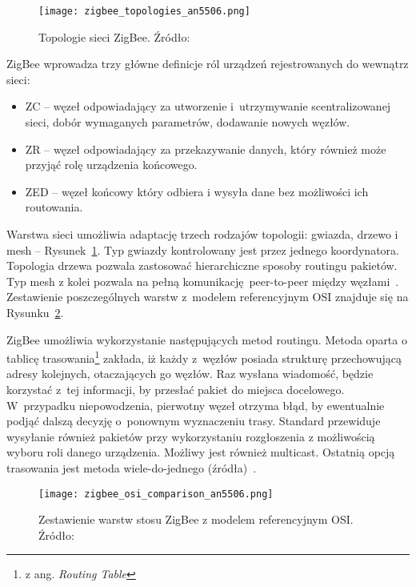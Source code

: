\begin{figure}[!ht]
	\centering \texttt{[image: zigbee\_topologies\_an5506.png]}
	\caption{Topologie sieci ZigBee. Źródło:~\cite{stmicroelectronics_an5506_2020}}
	\label{rys:zigbee_topologies_an5506}
\end{figure}

ZigBee wprowadza trzy główne definicje ról urządzeń rejestrowanych do wewnątrz sieci:
\begin{itemize}
\item \gls{ZC} -- węzeł odpowiadający za utworzenie i~utrzymywanie scentralizowanej sieci, dobór wymaganych parametrów, dodawanie nowych węzłów.
\item \gls{ZR} -- węzeł odpowiadający za przekazywanie danych, który również może przyjąć rolę urządzenia końcowego. 
\item \gls{ZED} -- węzeł końcowy który odbiera i wysyła dane bez możliwości ich routowania.
\end{itemize}

Warstwa sieci umożliwia adaptację trzech rodzajów topologii: gwiazda, drzewo i mesh -- Rysunek~\ref{rys:zigbee_topologies_an5506}.
Typ gwiazdy kontrolowany jest przez jednego koordynatora. Topologia drzewa pozwala zastosować hierarchiczne
sposoby routingu pakietów. Typ mesh z kolei pozwala na pełną komunikację peer-to-peer między węzłami~\cite{zigbee_alliance_zigbee_2017}.
Zestawienie poszczególnych warstw z~modelem referencyjnym OSI znajduje się na Rysunku~\ref{rys:zigbee_osi_comparison_an5506}.

ZigBee umożliwia wykorzystanie następujących metod routingu. Metoda oparta o tablicę trasowania\footnote{z ang. \textit{Routing Table}}
zakłada, iż każdy z~węzłów posiada strukturę przechowującą adresy kolejnych, otaczających go węzłów. Raz wysłana wiadomość,
będzie korzystać z~tej informacji, by przesłać pakiet do miejsca docelowego. W~przypadku niepowodzenia, pierwotny węzeł otrzyma
błąd, by ewentualnie podjąć dalszą decyzję o~ponownym wyznaczeniu trasy. Standard przewiduje wysyłanie również pakietów
przy wykorzystaniu rozgłoszenia z możliwością wyboru roli danego urządzenia. Możliwy jest również multicast. Ostatnią
opcją trasowania jest metoda wiele-do-jednego (źródła)~\cite{silicon_laboratories_ug10302_2021}.

\begin{figure}[!ht]
	\centering \texttt{[image: zigbee\_osi\_comparison\_an5506.png]}
	\caption{Zestawienie warstw stosu ZigBee z modelem referencyjnym OSI. Źródło:~\cite{stmicroelectronics_an5506_2020}}
	\label{rys:zigbee_osi_comparison_an5506}
\end{figure}

